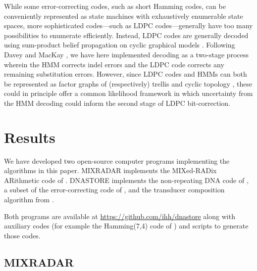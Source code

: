 \documentclass[english]{article}
\begin{document}
While some error-correcting codes, such as short Hamming codes, can be conveniently represented
as state machines with exhaustively enumerable state spaces,
more sophisticated codes---such as LDPC codes---generally have too many possibilities to enumerate efficiently.
Instead, LDPC codes are generally decoded using sum-product belief propagation on cyclic graphical models \cite{Mackay1997,FreyMackay98}.
Following Davey and MacKay \cite{DaveyMackay2000},
we have here implemented decoding as a two-stage process wherein the HMM corrects indel errors
and the LDPC code corrects any remaining substitution errors.
However, since LDPC codes and HMMs can both be represented as factor graphs
of (respectively) trellis and cyclic topology \cite{Kschischang2006},
these could in principle offer a common likelihood framework in which uncertainty from the HMM decoding
could inform the second stage of LDPC bit-correction.


\section{Results}

We have developed two open-source computer programs implementing the algorithms in this paper.
MIXRADAR implements the MIXed-RADix ARithmetic code of .
DNASTORE implements the non-repeating DNA code of ,
a subset of the error-correcting code of ,
and the transducer composition algorithm from .

Both programs are available at \url{https://github.com/ihh/dnastore}
along with auxiliary codes (for example the Hamming(7,4) code of )
and scripts to generate those codes.

\subsection{MIXRADAR}
\end{document}
